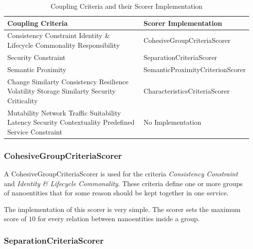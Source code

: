 \begin{table}[H]
	\centering
	\caption{Coupling Criteria and their Scorer Implementation}
	\label{tab:scorer}
	\begin{tabular}{|p{170pt}|p{200pt}|}
		\hline	
		\textbf{Coupling Criteria} & \textbf{Scorer Implementation}  \\
		\hline
		Consistency Constraint \newline Identity \& Lifecycle Commonality \newline Responsibility & CohesiveGroupCriteriaScorer \\
		\hline
		Security Constraint & SeparationCriteriaScorer \\
		\hline
		Semantic Proximity & SemanticProximityCriterionScorer \\
		\hline
		Change Similarty \newline Consistency \newline Resilience \newline Volatility \newline Storage Similarty \newline Security Criticality & CharacteristicsCriteriaScorer  \\
		\hline
		Mutability \newline Network Traffic Suitability \newline Latency \newline Security Contextuality \newline Predefined Service Constraint & No Implementation  \\
		\hline
	\end{tabular}
\end{table}

\subsubsection{CohesiveGroupCriteriaScorer}

A CohesiveGroupCriteriaScorer is used for the criteria \textit{Consistency Constraint} and \textit{Identity \& Lifecycle Commonality}. These criteria define one or more groups of nanoentities that for some reason should be kept together in one service.

The implementation of this scorer is very simple. The scorer sets the maximum score of $10$ for every relation between nanoentities inside a group. 

\subsubsection{SeparationCriteriaScorer}

